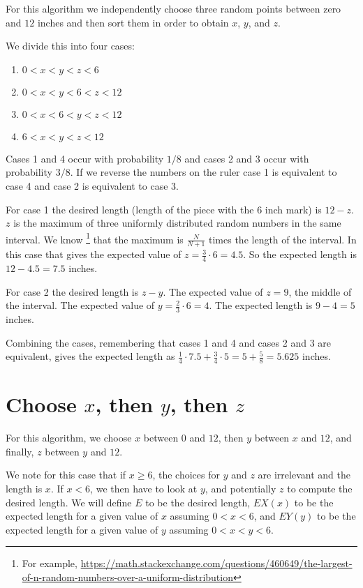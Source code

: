 \documentclass{article}
\begin{document}
For this algorithm we independently choose three random points between zero and $12$ inches and then sort them in order to obtain $x$, $y$, and $z$.

We divide this into four cases:
\begin{enumerate}
\item $0 < x < y < z < 6$
\item $0 < x < y < 6 < z < 12$
\item $0 < x < 6 < y < z < 12$
\item $6 < x < y < z < 12$
\end{enumerate}

Cases 1 and 4 occur with probability $1/8$ and cases 2 and 3 occur with probability $3/8$. If we reverse the numbers on the ruler case 1 is equivalent
to case 4 and case 2 is equivalent to case 3.

For case 1 the desired length (length of the piece with the $6$ inch mark) is $12 - z$. $z$ is the maximum of three uniformly distributed random numbers
in the same interval. We know \footnote{For example,
\url{https://math.stackexchange.com/questions/460649/the-largest-of-n-random-numbers-over-a-uniform-distribution}} that the maximum is $\frac{N}{N+1}$
times the length of the interval. In this case that gives the expected value of $z = \frac{3}{4} \cdot 6  = 4.5$. So the expected length is $12 - 4.5 = 7.5$ inches.

For case 2 the desired length is $z - y$. The expected value of $z = 9$, the middle of the interval. The expected value of $y = \frac{2}{3} \cdot 6 = 4$. The
expected length is $9 - 4 = 5$ inches.

Combining the cases, remembering that cases 1 and 4 and cases 2 and 3 are equivalent, gives the expected length as $ \frac{1}{4} \cdot 7.5 + \frac {3}{4} \cdot 5 = 5 + \frac{5}{8} = 5.625$ inches.

\section{Choose $x$, then $y$, then $z$}

For this algorithm, we choose $x$ between $0$ and $12$, then $y$ between $x$ and $12$, and finally, $z$ between $y$ and $12$.

We note for this case that if $x \ge 6$, the choices for $y$ and $z$ are irrelevant and the length is $x$. If $x < 6$, we then have to look at $y$, and potentially
$z$ to compute the desired length. We will define $E$ to be the desired length, $EX(x)$ to be the expected length for  a given value of $x$ assuming $0 < x < 6$, and $EY(y)$ to be the expected length for a given value of $y$ assuming $0 < x < y < 6$.
\end{document}
